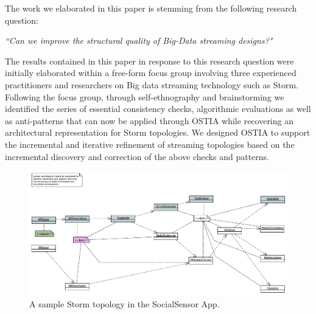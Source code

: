 
The work we elaborated in this paper is stemming from the following research question:

\begin{center}
\emph{``Can we improve the structural quality of Big-Data streaming designs?"}
\end{center}

The results contained in this paper in response to this research question were initially elaborated within a free-form focus group \cite{focusgroup} involving three experienced practitioners and researchers on Big data streaming technology such as Storm. Following the focus group, through self-ethnography \cite{selfeth} and brainstorming we identified the series of essential consistency checks, algorithmic evaluations as well as anti-patterns that can now be applied through OSTIA while recovering an architectural representation for Storm topologies. We designed OSTIA to support the incremental and iterative refinement of streaming topologies based on the incremental discovery and correction of the above checks and patterns.

\begin{figure}
\includegraphics[width=\textwidth]{images/socialsensor}
  \caption{A sample Storm topology in the SocialSensor App.}\label{topo1}
\end{figure}

